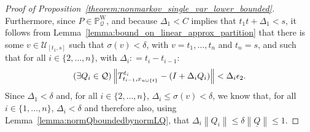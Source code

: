 \documentclass[10pt,a4paper]{paper}
\theoremstyle{definition}
\newcommand{\states}{\mathcal{X}}
\newcommand{\processes}{\mathbb{P}}
\newcommand{\wprocesses}{\processes^{\mathrm{W}}}
\newcommand{\gambles}{\mathcal{L}}
\newcommand{\gamblesX}{\gambles(\states)}
\newcommand{\rateset}{\mathcal{Q}}
\newcommand{\lrate}{\underline{Q}}
\newcommand{\norm}[1]{\left\lVert #1 \right\rVert}
\newcommand{\coloneqq}{:\!=}
\begin{document}
\begin{proof}[Proof of Proposition~\ref{theorem:nonmarkov_single_var_lower_bounded}]
Furthermore, since $P\in\wprocesses_\rateset$, and because $\Delta_1<C$ implies that $t_1t+\Delta_1<s$, it follows from Lemma~\ref{lemma:bound_on_linear_approx_partition} that there is some $v\in\mathcal{U}_{[t_1,s]}$ such that $\sigma(v)<\delta$, with $v=t_1,\ldots,t_n$ and $t_n=s$, and such that for all $i\in\{2,\ldots,n\}$, with $\Delta_i\coloneqq t_i-t_{i-1}$:
\begin{equation*}
(\exists Q_i\in\rateset)\norm{T_{t_{i-1},x_{u\cup \{t\}}}^{t_{i}} - (I+\Delta_{i}Q_i)} < \Delta_{i}\epsilon_2.\vspace{5pt}
\end{equation*}
Since $\Delta_1<\delta$ and, for all $i\in\{2,\dots,n\}$, $\Delta_i\leq\sigma(v)<\delta$, we know that, for all $i\in\{1,\dots,n\}$, $\Delta_i<\delta$ and therefore also, using Lemma~\ref{lemma:normQboundedbynormLQ}, that $\Delta_i\norm{Q_i}\leq\delta\norm{\lrate}\leq1$.

\end{proof}
\end{document}
